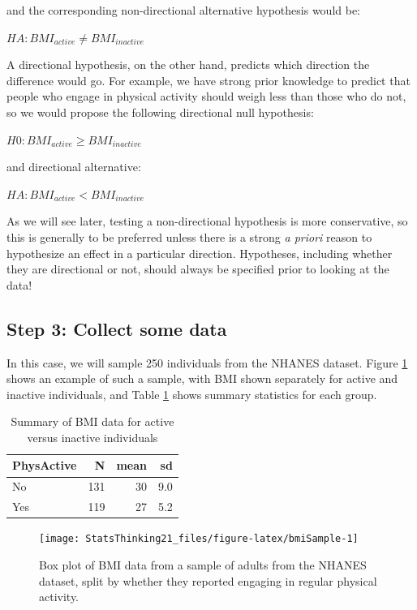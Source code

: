 \documentclass[12pt,]{book}
\theoremstyle{definition}
\theoremstyle{definition}
\theoremstyle{definition}
\theoremstyle{remark}
\begin{document}
and the corresponding non-directional alternative hypothesis would be:

\(HA: BMI_{active} \neq BMI_{inactive}\)

A directional hypothesis, on the other hand, predicts which direction the difference would go. For example, we have strong prior knowledge to predict that people who engage in physical activity should weigh less than those who do not, so we would propose the following directional null hypothesis:

\(H0: BMI_{active} \ge BMI_{inactive}\)

and directional alternative:

\(HA: BMI_{active} < BMI_{inactive}\)

As we will see later, testing a non-directional hypothesis is more conservative, so this is generally to be preferred unless there is a strong \emph{a priori} reason to hypothesize an effect in a particular direction. Hypotheses, including whether they are directional or not, should always be specified prior to looking at the data!

\hypertarget{step-3-collect-some-data}{%
\subsection{Step 3: Collect some data}\label{step-3-collect-some-data}}

In this case, we will sample 250 individuals from the NHANES dataset. Figure \ref{fig:bmiSample} shows an example of such a sample, with BMI shown separately for active and inactive individuals, and Table \ref{tab:summaryTable} shows summary statistics for each group.

\begin{table}

\caption{\label{tab:summaryTable}Summary of BMI data for active versus inactive individuals}
\centering
\begin{tabular}[t]{l|r|r|r}
\hline
PhysActive & N & mean & sd\\
\hline
No & 131 & 30 & 9.0\\
\hline
Yes & 119 & 27 & 5.2\\
\hline
\end{tabular}
\end{table}

\begin{figure}
\texttt{[image: StatsThinking21\_files/figure-latex/bmiSample-1]} \caption{Box plot of BMI data from a sample of adults from the NHANES dataset, split by whether they reported engaging in regular physical activity.}\label{fig:bmiSample}
\end{figure}
\end{document}
